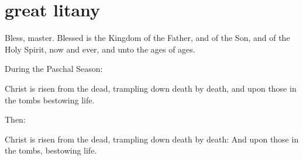 \section{great litany}

\begin{liturgicaltext}
    \deacon Bless, master. 
    \priest Blessed is the Kingdom of the Father, and of the Son, and of the Holy Spirit, now and ever, and unto the ages of ages.
    \choir {}
\end{liturgicaltext}

\begin{rubricsection}
    \begin{rubricmed}
        During the Paschal Season:
    \end{rubricmed}
    \begin{liturgicaltext}
        \clergy Christ is risen from the dead, trampling down death by death, and upon those in the tombs bestowing life. 
    \end{liturgicaltext}
    \begin{rubricmed}
        Then:
    \end{rubricmed}
    \begin{liturgicaltext}
        \clergy Christ is risen from the dead, trampling down death by death:
        \choir And upon those in the tombs, bestowing life.
    \end{liturgicaltext}

\end{rubricsection}
\pagebreak

